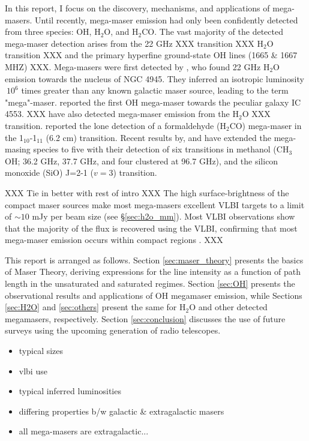 In this report, I focus on the discovery, mechanisms, and applications of mega-masers. Until recently, mega-maser emission had only been confidently detected from three species: OH, H$_2$O, and H$_2$CO. The vast majority of the detected mega-maser detection arises from the 22 GHz XXX transition XXX H$_2$O transition XXX and the primary hyperfine ground-state OH lines (1665 \& 1667 MHZ) XXX. Mega-masers were first detected by \citet{DOS_SANTOS_1979}, who found 22 GHz H$_2$O emission towards the nucleus of NGC 4945. They inferred an isotropic luminosity $~10^6$ times greater than any known galactic maser source, leading to the term "mega"-maser. \citet{Baan_1982} reported the first OH mega-maser towards the peculiar galaxy IC 4553. XXX have also detected mega-maser emission from the H$_2$O XXX transition. \citet{baan1986} reported the lone detection of a formaldehyde (H$_2$CO) mega-maser in the 1$_{10}$-1$_{11}$ (6.2 cm) transition. Recent results by, \citet{wang2014} and \citet{chen2015} have extended the mega-masing species to five with their detection of six transitions in methanol (CH$_3$OH; 36.2 GHz, 37.7 GHz, and four clustered at 96.7 GHz), and the silicon monoxide (SiO) J=2-1  ($v=3$) transition. 

XXX Tie in better with rest of intro XXX
The high surface-brightness of the compact maser sources make most mega-masers excellent VLBI targets to a limit of $\sim 10$ mJy per beam size (see \S\ref{sec:h2o_mm}). Most VLBI observations show that the majority of the flux is recovered using the VLBI, confirming that most mega-maser emission occurs within compact regions \citep{lo2005}. XXX

This report is arranged as follows. Section \ref{sec:maser_theory} presents the basics of Maser Theory, deriving expressions for the line intensity as a function of path length in the unsaturated and saturated regimes. Section \ref{sec:OH} presents the observational results and applications of OH megamaser emission, while Sections \ref{sec:H2O} and \ref{sec:others} present the same for H$_2$O and other detected megamasers, respectively. Section \ref{sec:conclusion} discusses the use of future surveys using the upcoming generation of radio telescopes.

\begin{itemize}
\item typical sizes
\item vlbi use
\item typical inferred luminosities
\item differing properties b/w galactic & extragalactic masers
\item all mega-masers are extragalactic...
\end{itemize}